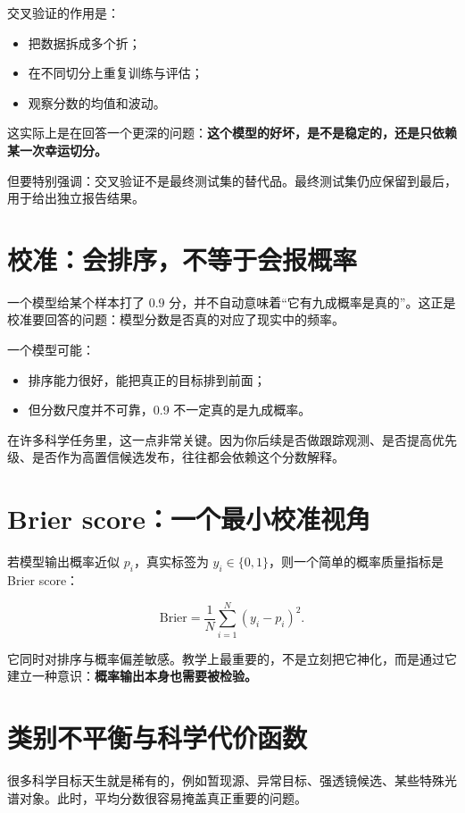 交叉验证的作用是：

\begin{itemize}
    \item 把数据拆成多个折；
    \item 在不同切分上重复训练与评估；
    \item 观察分数的均值和波动。
\end{itemize}

这实际上是在回答一个更深的问题：\textbf{这个模型的好坏，是不是稳定的，还是只依赖某一次幸运切分。}

但要特别强调：交叉验证不是最终测试集的替代品。最终测试集仍应保留到最后，用于给出独立报告结果。

\section{校准：会排序，不等于会报概率}

一个模型给某个样本打了 $0.9$ 分，并不自动意味着“它有九成概率是真的”。这正是校准要回答的问题：模型分数是否真的对应了现实中的频率。

一个模型可能：

\begin{itemize}
    \item 排序能力很好，能把真正的目标排到前面；
    \item 但分数尺度并不可靠，0.9 不一定真的是九成概率。
\end{itemize}

在许多科学任务里，这一点非常关键。因为你后续是否做跟踪观测、是否提高优先级、是否作为高置信候选发布，往往都会依赖这个分数解释。

\section{Brier score：一个最小校准视角}

若模型输出概率近似 $p_i$，真实标签为 $y_i \in \{0,1\}$，则一个简单的概率质量指标是 Brier score：

\[
\mathrm{Brier} =
\frac{1}{N}\sum_{i=1}^{N}(y_i - p_i)^2.
\]

它同时对排序与概率偏差敏感。教学上最重要的，不是立刻把它神化，而是通过它建立一种意识：\textbf{概率输出本身也需要被检验。}

\section{类别不平衡与科学代价函数}

很多科学目标天生就是稀有的，例如暂现源、异常目标、强透镜候选、某些特殊光谱对象。此时，平均分数很容易掩盖真正重要的问题。

